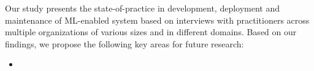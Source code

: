 
Our study presents the state-of-practice in development, deployment and maintenance of ML-enabled system based on interviews with practitioners across multiple organizations of various sizes and in different domains. Based on our findings, we propose the following key areas for future research:
\begin{itemize}
    \item 
\end{itemize}



